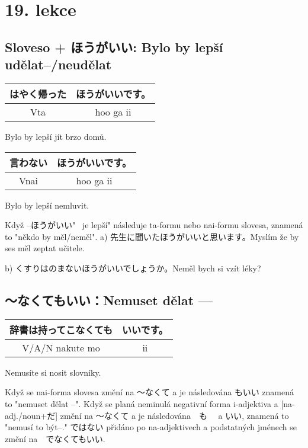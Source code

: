 \section{19. lekce}
\label{sec:lekce_19}

\subsection{Sloveso + ほうがいい: Bylo by lepší udělat--/neudělat}
\begin{center}
\begin{tabular}{|c|c|}
\hline
はやく帰った& ほうがいいです。\\
\hline
Vta&hoo ga ii\\
\hline
\end{tabular}
\end{center}
Bylo by lepší jít brzo domů.


\begin{center}
\begin{tabular}{|c|c|}
\hline
言わない&ほうがいいです。\\
\hline
Vnai&hoo ga ii\\
\hline
\end{tabular}
\end{center}
Bylo by lepší nemluvit.


Když  --ほうがいい"~ je lepší" následuje ta-formu nebo nai-formu slovesa, znamená to "někdo by měl/neměl".
a) 先生に聞いたほうがいいと思います。Myslím že by ses měl zeptat učitele.

b) くすりはのまないほうがいいでしょうか。Neměl bych si vzít léky?



\subsection{〜なくてもいい：Nemuset dělat  ---}
\begin{center}
\begin{tabular}{|c|c|}
\hline
辞書は持ってこなくても&いいです。\\
\hline
V/A/N nakute mo&ii\\
\hline
\end{tabular}
\end{center}
Nemusíte si nosit slovníky.

Když se nai-forma slovesa změní na 〜なくて a je následována もいい znamená to "nemuset dělat --". Když se planá neminulá negativní forma i-adjektiva a  [na- adj./noun+だ] změní na 〜なくて a je následována　も　 a いい, znamená to "nemusí to být--." ではない přidáno po na-adjektivech a podstatných jménech se změní na　でなくてもいい.

